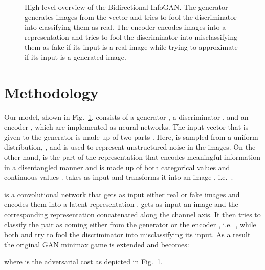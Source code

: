 \documentclass{esannV2}
\begin{document}
\begin{figure}
 \vspace{-0.5cm}
\caption{High-level overview of the Bidirectional-InfoGAN. The generator  generates images from the vector  and tries to fool the discriminator into classifying them as real. The encoder  encodes images into a representation and tries to fool the discriminator  into misclassifying them as fake if its input is a real image while trying to approximate  if its input is a generated image.}
\vspace{-0.3cm}
\label{fig:model_architecture}
\end{figure}


\section{Methodology}
Our model, shown in Fig.~\ref{fig:model_architecture}, consists of a generator , a discriminator , and an encoder , which are implemented as neural networks. The input vector  that is given to the generator  is made up of two parts . Here,  is sampled from a uniform distribution, , and is used to represent unstructured noise in the images. On the other hand,  is the part of the representation that encodes meaningful information in a disentangled manner and is made up of both categorical values  and continuous values .  takes  as input and transforms it into an image , i.e.\ .

 is a convolutional network that gets as input either real or fake images and encodes them into a latent representation .  gets as input an image  and the corresponding representation  concatenated along the channel axis. It then tries to classify the pair as coming either from the generator  or the encoder , i.e.\ , while both  and  try to fool the discriminator into misclassifying its input. As a result the original GAN minimax game \cite{Goodfellow2014} is extended and becomes:

where  is the adversarial cost as depicted in Fig.~\ref{fig:model_architecture}.
\end{document}
